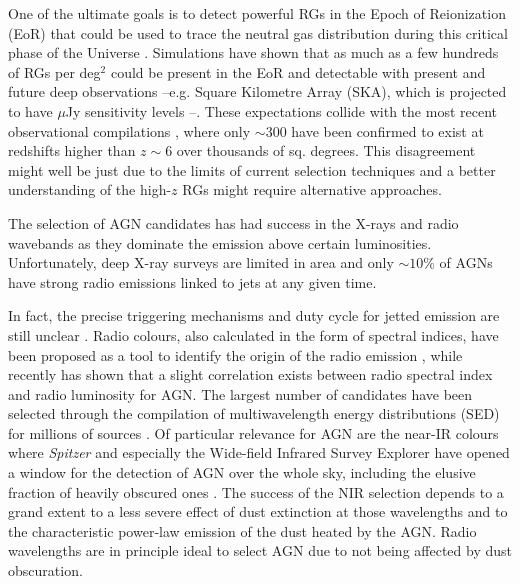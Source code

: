 \documentclass{aa}
\begin{document}
One of the ultimate goals is to detect powerful RGs in the Epoch of Reionization (EoR) that could be used to trace the neutral gas distribution during this critical phase of the Universe \citep[e.g.][]{2004NewAR..48.1029C, 2013MNRAS.435..460J}.
Simulations  have shown that as much as a few hundreds of RGs per deg$^2$ could be present in the EoR \citep[][]{2019MNRAS.485.2694A, 2019MNRAS.482....2B, 2021MNRAS.503.3492T} and detectable with present and future deep observations --e.g. Square Kilometre Array (SKA), which is projected to have $\mu$Jy sensitivity levels \citep{2015aska.confE..67P}--.
These expectations collide with the most recent observational compilations \citep[e.g.][]{2020ARA&A..58...27I, 2020MNRAS.494..789R}, where only ${\sim}300$ have been confirmed to exist at redshifts higher than $z{\sim}6$ over thousands of sq. degrees. This disagreement might well be just due to the limits of current selection techniques and a better understanding of the high-$z$ RGs might require alternative approaches.

The selection of AGN candidates has had success in the X-rays and radio wavebands as they dominate the emission above certain luminosities. Unfortunately, deep X-ray surveys are limited in area and 
only ${\sim}10\%$ of AGNs have strong radio emissions linked to jets \citep[e.g.][]{1993MNRAS.263..461P, 2019NatAs...3...48S, 2021MNRAS.506.5888M} at any given time.

In fact, the precise triggering mechanisms and duty cycle for jetted emission are still unclear \citep{2015aska.confE..71A, 2022MNRAS.510.1163P}. Radio colours, also calculated in the form of spectral indices, have been proposed as a tool to identify the origin of the radio emission \citep{2000A&A...354..423L}, while recently \citet{2019A&A...622A..17S} has shown that a  slight correlation exists between radio spectral index and radio luminosity for AGN.
The largest number of candidates have been selected through the compilation of multiwavelength energy distributions (SED) for millions of sources \citep{2018ARA&A..56..625H, 2020PhDT.........3P}.  Of particular relevance for AGN are the near-IR colours where \textit{Spitzer} \citep{2004ApJS..154....1W} and especially  the Wide-field Infrared Survey Explorer \citep[\textit{WISE};][]{2010AJ....140.1868W} have opened a window for the detection of AGN over the whole sky, including the elusive fraction of heavily obscured ones \citep[e.g.][]{2012ApJ...753...30S, 2012MNRAS.426.3271M, 2017ApJ...836..182J, 2018ApJS..234...23A, 2021ApJ...922..179B}. The success of the NIR selection depends to a grand extent to a less severe effect of dust extinction at those wavelengths and to the characteristic power-law emission of the dust heated by the AGN. Radio wavelengths are in principle ideal to select AGN due to not being affected by dust obscuration. 
\end{document}
